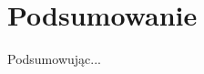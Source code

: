 \chapter{Podsumowanie}
\thispagestyle{chapterBeginStyle}
\label{rozdzial6}

Podsumowując...

\cleardoublepage